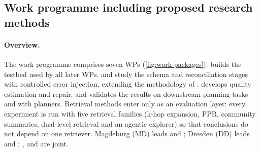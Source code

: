 \subsection{Work programme including proposed research methods}

\paragraph{Overview.}
The work programme comprises seven \acp{WP} (\autoref{fig:work-packages}).  builds the testbed used by all later \acp{WP}.  and  study the schema and reconciliation stages with controlled error injection, extending the methodology of \parencite{reider2026graph}.  develops quality estimation and repair, and  validates the results on downstream planning tasks and with planners. Retrieval methods enter only as an evaluation layer: every experiment is run with five retrieval families (k-hop expansion, \ac{PPR}, community summaries, dual-level retrieval and an agentic explorer) so that conclusions do not depend on one retriever. Magdeburg (MD) leads  and ; Dresden (DD) leads  and ; ,  and  are joint.

